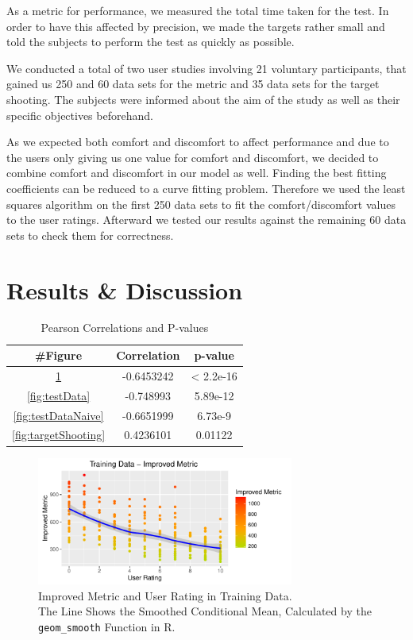 \documentclass{sig-alternate-05-2015}
\begin{document}
As a metric for performance, we measured the total time taken for the test. In order to have this affected by precision, we made the targets rather small and told the subjects to perform the test as quickly as possible.

We conducted a total of two user studies involving 21 voluntary participants, that gained us 250 and 60 data sets for the metric and 35 data sets for the target shooting.
The subjects were informed about the aim of the study as well as their specific objectives beforehand.

As we expected both comfort and discomfort to affect performance and due to the users only giving us one value for comfort and discomfort, we decided to combine comfort and discomfort in our model as well. Finding the best fitting coefficients can be reduced to a curve fitting problem. Therefore we used the least squares algorithm on the first 250 data sets to fit the comfort/discomfort values to the user ratings. Afterward we tested our results against the remaining 60 data sets to check them for correctness. 

\section{Results \& Discussion}

\begin{table}[b]
\centering
\begin{tabular}{|c|c|c|} \hline
\#Figure & Correlation & p-value\\ \hline
\ref{fig:trainingData} & -0.6453242 & < 2.2e-16\\ \hline
\ref{fig:testData} & -0.748993 & 5.89e-12\\ \hline
\ref{fig:testDataNaive} & -0.6651999 & 6.73e-9\\ \hline
\ref{fig:targetShooting} & 0.4236101 & 0.01122\\ \hline
\end{tabular}
\caption{Pearson Correlations and P-values}
\label{tab:correlations}
\end{table}

\begin{figure}[b]
\centering
\includegraphics[width=8.45cm]{TrainingDataImproved}
\vspace{-20pt}
\caption{Improved Metric and User Rating in Training Data. \\
The Line Shows the Smoothed Conditional Mean, Calculated by the \texttt{geom\_smooth} Function in R.}
\label{fig:trainingData}
\vspace{-10pt}
\end{figure}
\end{document}
